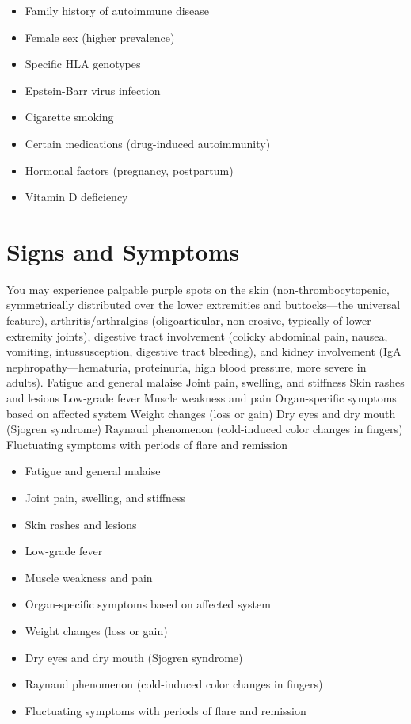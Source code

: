 \begin{itemize}[noitemsep]
  \item Family history of autoimmune disease
  \item Female sex (higher prevalence)
  \item Specific HLA genotypes
  \item Epstein-Barr virus infection
  \item Cigarette smoking
  \item Certain medications (drug-induced autoimmunity)
  \item Hormonal factors (pregnancy, postpartum)
  \item Vitamin D deficiency
\end{itemize}
\section{Signs and Symptoms}
You may experience palpable purple spots on the skin (non-thrombocytopenic, symmetrically distributed over the lower extremities and buttocks---the universal feature), arthritis/arthralgias (oligoarticular, non-erosive, typically of lower extremity joints), digestive tract involvement (colicky abdominal pain, nausea, vomiting, intussusception, digestive tract bleeding), and kidney involvement (IgA nephropathy---hematuria, proteinuria, high blood pressure, more severe in adults). Fatigue and general malaise Joint pain, swelling, and stiffness Skin rashes and lesions Low-grade fever Muscle weakness and pain Organ-specific symptoms based on affected system Weight changes (loss or gain) Dry eyes and dry mouth (Sjogren syndrome) Raynaud phenomenon (cold-induced color changes in fingers) Fluctuating symptoms with periods of flare and remission

\begin{itemize}[noitemsep]
  \item Fatigue and general malaise
  \item Joint pain, swelling, and stiffness
  \item Skin rashes and lesions
  \item Low-grade fever
  \item Muscle weakness and pain
  \item Organ-specific symptoms based on affected system
  \item Weight changes (loss or gain)
  \item Dry eyes and dry mouth (Sjogren syndrome)
  \item Raynaud phenomenon (cold-induced color changes in fingers)
  \item Fluctuating symptoms with periods of flare and remission
\end{itemize}
